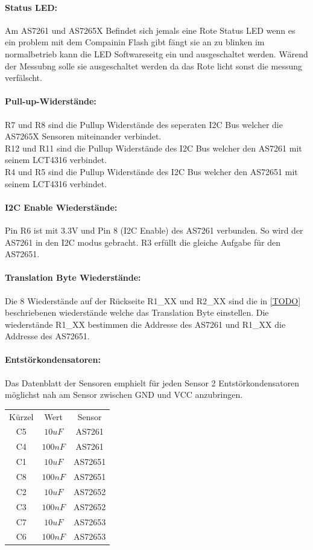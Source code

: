 \paragraph{Status LED:} Am AS7261 und AS7265X Befindet sich jemals eine Rote Status LED wenn es ein problem mit dem Compainin Flash gibt fängt sie an zu blinken im normalbetrieb kann die LED Softwareseitg ein und ausgeschaltet werden.
	Wärend der Messubng solle sie ausgeschaltet werden da das Rote licht sonst die messung verfälscht.


\paragraph{Pull-up-Widerstände:}
R7 und R8 sind die Pullup Widerstände des seperaten I2C Bus welcher die AS7265X Sensoren miteinander verbindet.\\
R12 und R11 sind die Pullup Widerstände des I2C Bus welcher den AS7261 mit seinem LCT4316 verbindet.\\
R4 und R5 sind die Pullup Widerstände des I2C Bus welcher den AS72651 mit seinem LCT4316 verbindet.

\paragraph{I2C Enable Wiederstände:} Pin R6 ist mit 3.3V und Pin 8 (I2C Enable) des AS7261 verbunden. So wird der AS7261 in den I2C modus gebracht.
	R3 erfüllt die gleiche Aufgabe für den AS72651.
	
\paragraph{Translation Byte Wiederstände:}
Die 8 Wiederstände auf der Rückseite R1\_XX und R2\_XX sind die in \ref{TODO} beschriebenen wiederstände welche das Translation Byte einstellen. Die wiederstände R1\_XX bestimmen die Addresse des AS7261 und R1\_XX die Addresse des AS72651.

\paragraph{Entstörkondensatoren:} Das Datenblatt der Sensoren emphielt für jeden Sensor 2 Entstörkondensatoren möglichst nah am Sensor zwischen GND und VCC anzubringen.


\begin{center}
\begin{tabular}{ c c c }
 Kürzel & Wert & Sensor \\ 
 C5 & $10uF$ & AS7261 \\  
 C4 & $100nF$ & AS7261 \\
 C1 & $10uF$ & AS72651 \\  
 C8 & $100nF$ & AS72651 \\
 C2 & $10uF$ & AS72652 \\  
 C3 & $100nF$ & AS72652 \\
 C7 & $10uF$ & AS72653 \\  
 C6 & $100nF$ & AS72653 \\
\end{tabular}
\end{center}



